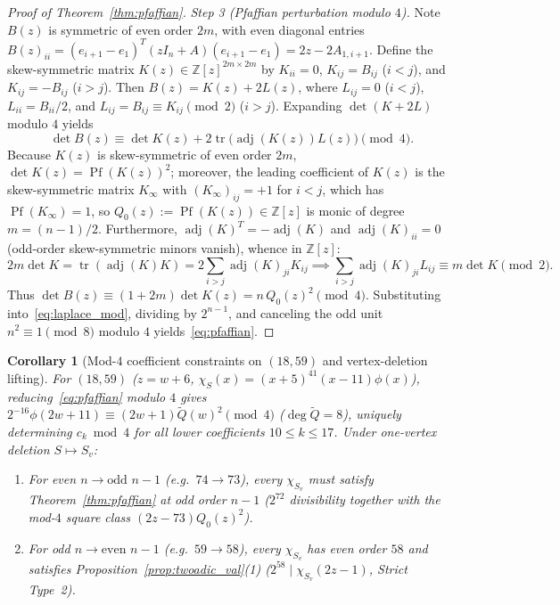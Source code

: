 \documentclass[11pt,reqno]{amsart}
\newtheorem{corollary}[theorem]{Corollary}
\theoremstyle{definition}
\theoremstyle{remark}
\DeclareMathOperator{\tr}{tr}
\DeclareMathOperator{\adj}{adj}
\DeclareMathOperator{\Pf}{Pf}
\begin{document}
\begin{proof}[Proof of Theorem~\ref{thm:pfaffian}]
\emph{Step 3 (Pfaffian perturbation modulo $4$).} Note $B(z)$ is symmetric of even order $2m$, with even diagonal entries $B(z)_{ii} = (e_{i+1} - e_1)^T(zI_n + A)(e_{i+1} - e_1) = 2z - 2A_{1, i+1}$. Define the skew-symmetric matrix $K(z) \in \mathbb{Z}[z]^{2m \times 2m}$ by $K_{ii} = 0$, $K_{ij} = B_{ij}$ ($i < j$), and $K_{ij} = -B_{ij}$ ($i > j$). Then $B(z) = K(z) + 2L(z)$, where $L_{ij} = 0$ ($i < j$), $L_{ii} = B_{ii}/2$, and $L_{ij} = B_{ij} \equiv K_{ij} \pmod 2$ ($i > j$). Expanding $\det(K + 2L)$ modulo $4$ yields
\[
  \det B(z) \equiv \det K(z) + 2\tr\!\big(\adj(K(z)) L(z)\big) \pmod{4}.
\]
Because $K(z)$ is skew-symmetric of even order $2m$, $\det K(z) = \Pf(K(z))^2$; moreover, the leading coefficient of $K(z)$ is the skew-symmetric matrix $K_\infty$ with $(K_\infty)_{ij} = +1$ for $i < j$, which has $\Pf(K_\infty) = 1$, so $Q_0(z) := \Pf(K(z)) \in \mathbb{Z}[z]$ is monic of degree $m = (n-1)/2$. Furthermore, $\adj(K)^T = -\adj(K)$ and $\adj(K)_{ii} = 0$ (odd-order skew-symmetric minors vanish), whence in $\mathbb{Z}[z]$:
\[
  2m \det K = \tr(\adj(K) K) = 2 \sum_{i > j} \adj(K)_{ji} K_{ij} \implies \sum_{i > j} \adj(K)_{ji} L_{ij} \equiv m \det K \pmod{2}.
\]
Thus $\det B(z) \equiv (1 + 2m)\det K(z) = n\,Q_0(z)^2 \pmod 4$. Substituting into~\eqref{eq:laplace_mod}, dividing by $2^{n-1}$, and canceling the odd unit $n^2 \equiv 1 \pmod 8$ modulo $4$ yields~\eqref{eq:pfaffian}.
\end{proof}

\begin{corollary}[Mod-$4$ coefficient constraints on $(18, 59)$ and vertex-deletion lifting]\label{cor:cor43}
For $(18, 59)$ ($z = w + 6$, $\chi_S(x) = (x+5)^{41}(x-11)\phi(x)$), reducing~\eqref{eq:pfaffian} modulo $4$ gives $2^{-16}\phi(2w + 11) \equiv (2w + 1)\tilde{Q}(w)^2 \pmod 4$ ($\deg\tilde{Q} = 8$), uniquely determining $c_k \bmod 4$ for all lower coefficients $10 \le k \le 17$. Under one-vertex deletion $S \mapsto S_v$:
\begin{enumerate}
  \item For even $n \to \text{odd } n-1$ (e.g.\ $74 \to 73$), every $\chi_{S_v}$ must satisfy Theorem~\ref{thm:pfaffian} at odd order $n - 1$ ($2^{72}$ divisibility together with the mod-$4$ square class $(2z-73)Q_0(z)^2$).
  \item For odd $n \to \text{even } n-1$ (e.g.\ $59 \to 58$), every $\chi_{S_v}$ has even order $58$ and satisfies Proposition~\ref{prop:twoadic_val}(1) ($2^{58} \mid \chi_{S_v}(2z-1)$, Strict Type~2).
\end{enumerate}
\end{corollary}
\end{document}
